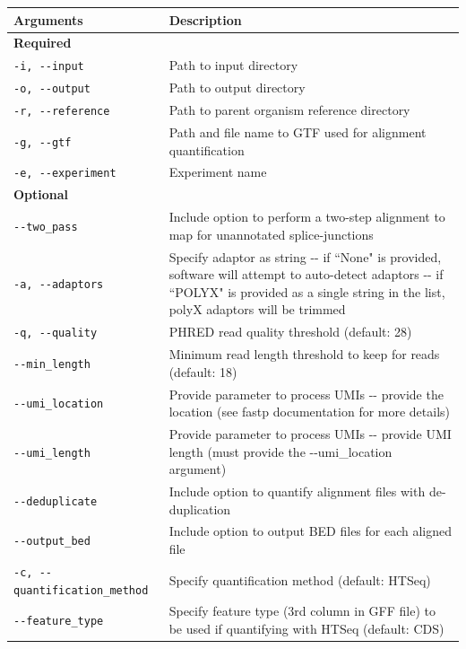 \documentclass[10pt, oneside]{article}
\begin{document}
\begin{table}[!]
    \centering
{}
\begin{tabular}{p{5cm}p{13cm}}
 \textbf{Arguments} & \textbf{Description} \\
 \hline
 \textbf{Required} & \\
 \hline
 \texttt{-i, -{}-input} & Path to input directory \\
 \hline
 \texttt{-o, -{}-output} & Path to output directory \\
 \hline
 \texttt{-r, -{}-reference} & Path to parent organism reference directory \\
 \hline
 \texttt{-g, -{}-gtf} & Path and file name to GTF used for alignment quantification \\
 \hline
 \texttt{-e, -{}-experiment} & Experiment name \\
 \hline
 \textbf{Optional} & \\
 \hline
 \texttt{-{}-two\_pass} & Include option to perform a two-step alignment to map for unannotated splice-junctions \\
 \hline
 \texttt{-a, -{}-adaptors} & Specify adaptor as string -{}- if ``None" is provided, software will attempt to auto-detect adaptors -{}- if ``POLYX" is provided as a single string in the list, polyX adaptors will be trimmed \\
 \hline
 \texttt{-q, -{}-quality} & PHRED read quality threshold (default: 28) \\
 \hline
 \texttt{-{}-min\_length} & Minimum read length threshold to keep for reads (default: 18) \\
 \hline
 \texttt{-{}-umi\_location} & Provide parameter to process UMIs -{}- provide the location (see fastp documentation for more details) \\
 \hline
 \texttt{-{}-umi\_length} & Provide parameter to process UMIs -{}- provide UMI length (must provide the -{}-umi\_location argument) \\
 \hline
 \texttt{-{}-deduplicate} & Include option to quantify alignment files with de-duplication \\
 \hline
 \texttt{-{}-output\_bed} & Include option to output BED files for each aligned file \\
 \hline
 \texttt{-c, -{}-quantification\_method} & Specify quantification method (default: HTSeq\cite{htseq}) \\
 \hline
 \texttt{-{}-feature\_type} & Specify feature type (3rd column in GFF file) to be used if quantifying with HTSeq (default: CDS) \\

\end{tabular}
\end{table}
\end{document}
